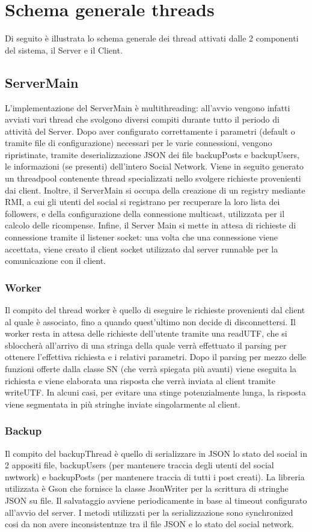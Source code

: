 \documentclass[11pt, a4paper, oneside]{article}
\begin{document}
\section{Schema generale threads}
Di seguito è illustrata lo schema generale dei thread attivati dalle 2 componenti del sistema, il Server e il Client.
\subsection{ServerMain}
L’implementazione del ServerMain è multithreading: all’avvio vengono infatti avviati vari thread che svolgono diversi compiti durante tutto il periodo di attività 
del Server. Dopo aver configurato correttamente i parametri (default o tramite file di configurazione) necessari per le varie connessioni, vengono ripristinate, tramite
deserializzazione JSON dei file backupPosts e backupUsers, le informazioni (se presenti) dell’intero Social Network. Viene in seguito generato un threadpool
contenente thread specializzati nello svolgere richieste provenienti dai client. Inoltre, il ServerMain si occupa della creazione di un registry mediante RMI, 
a cui gli utenti del social si registrano per recuperare la loro lista dei followers, e della configurazione della connessione multicast, utilizzata per il calcolo 
delle ricompense. Infine, il Server Main si mette in attesa di richieste di connessione tramite il listener socket: una volta che una connessione viene accettata, 
viene creato il client socket utilizzato dal server runnable per la comunicazione con il client.
\subsubsection{Worker}
Il compito del thread worker è quello di eseguire le richieste provenienti dal client al quale è associato, fino a quando quest’ultimo non decide di 
disconnettersi. Il worker resta in attesa delle richieste dell’utente tramite una readUTF, che si sbloccherà all’arrivo di una stringa della quale verrà effettuato 
il parsing per ottenere l’effettiva richiesta e i relativi parametri. Dopo il parsing per mezzo delle funzioni offerte dalla classe SN (che verrà spiegata più avanti) 
viene eseguita la richiesta e viene elaborata una risposta che verrà inviata al client tramite writeUTF. In alcuni casi, per evitare una stinge potenzialmente lunga, 
la risposta viene segmentata in più stringhe inviate singolarmente al client.
\subsubsection{Backup}
Il compito del backupThread è quello di serializzare in JSON lo stato del social in 2 appositi file, backupUsers (per mantenere traccia degli utenti del social nwtwork)
e backupPosts (per mantenere traccia di tutti i post creati). La libreria utilizzata è Gson che fornisce la classe
JsonWriter per la scrittura di stringhe JSON su file. Il salvataggio avviene periodicamente in base al timeout configurato all'avvio del server. I metodi
utilizzati per la serializzazione sono synchronized cosi da non avere inconsistentnze tra il file JSON e lo stato del social network.
\end{document}
